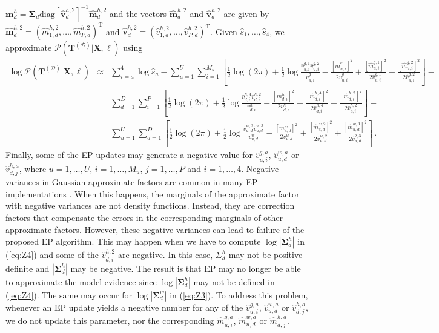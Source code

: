\documentclass{article}
\begin{document}
$\mathbf{m}_d^h = \bm \Sigma_d \text{diag}[\hat{\mathbf{v}}_d^{h,2}]^{-1} \hat{\mathbf{m}}_d^{h,2}$
and the vectors $\hat{\mathbf{m}}_d^{h,2}$ and $\hat{\mathbf{v}}_d^{h,2}$ are given by
$\hat{\mathbf{m}}_d^{h,2}=(\hat{m}_{1,d}^{h,2},\ldots,\hat{m}_{P,d}^{h,2})^\text{T}$ and
$\hat{\mathbf{v}}_d^{h,2}=(\hat{v}_{1,d}^{h,2},\ldots,\hat{v}_{P,d}^{h,2})^\text{T}$.
Given $\hat{s}_1,\ldots,\hat{s}_4$, we approximate $\mathcal{P}(\mathbf{T}^{(\mathcal{D})}|\mathbf{X},\ell)$ using
\begin{eqnarray}
\log \mathcal{P}(\mathbf{T}^{(\mathcal{D})}|\mathbf{X},\ell) & \approx & \sum_{i=a}^{4}\log\hat{s}_{a}-
\sum_{u=1}^{U}\sum_{i=1}^{M_u}\left[\frac{1}{2}\log(2\pi)+\frac{1}{2}\log \frac{\hat{v}_{u,i}^{g,1} \hat{v}_{u,i}^{g,2}}{v_{u,i}^g}-
\frac{[m_{u,i}^g]^2}{2v_{u,i}^g}+\frac{[\hat{m}_{u,i}^{g,1}]^2}{2\hat{v}_{u,i}^{g,1}}+
\frac{[\hat{m}_{u,i}^{g,2}]^2}{2\hat{v}_{u,i}^{g,2}}\right]-\nonumber\\
& & \sum_{d=1}^{D}\sum_{i=1}^{P}\left[
\frac{1}{2}\log(2\pi)+\frac{1}{2}\log \frac{\hat{v}_{d,i}^{h,4} \hat{v}_{d,i}^{h,2}}{v_{d,i}^h}-
\frac{[m_{d,i}^h]^2}{2v_{d,i}^h}+\frac{[\hat{m}_{d,i}^{h,4}]^2}{2\hat{v}_{d,i}^{h,4}}+
\frac{[\hat{m}_{d,i}^{h,2}]^2}{2\hat{v}_{d,i}^{h,2}}\right]-\nonumber\\
& & \sum_{u=1}^{U}\sum_{d=1}^{D}\left[\frac{1}{2}\log(2\pi)+
\frac{1}{2}\log \frac{\hat{v}_{u,d}^{w,2}\hat{v}_{u,d}^{w,3}}{v_{u,d}^w}-
\frac{[m_{u,d}^w]^2}{2v_{u,d}^w}+\frac{[\hat{m}_{u,d}^{w,2}]^2}{2\hat{v}_{u,d}^{w,2}}+
\frac{[\hat{m}_{u,d}^{w,3}]^2}{2\hat{v}_{u,d}^{2,3}}\right]\,.\label{eq:EPevidenceApprox}
\end{eqnarray}
Finally, some of the EP updates may generate a negative value for $\hat{v}_{u,i}^{g,a}$, 
$\hat{v}_{u,d}^{w,a}$ or $\hat{v}_{d,j}^{h,a}$, where $u = 1,\ldots,U$, $i = 1,\ldots,M_u$, $j = 1,\ldots,P$ and $i = 1,\ldots,4$.
Negative variances in Gaussian approximate factors 
are common in many EP implementations \citep{Minka2001,Minka2002}.
When this happens, the marginals of the approximate factor with negative 
variances are not density functions. Instead, they
are correction factors that compensate the errors in the corresponding marginals of other approximate factors.
However, these negative variances can lead to failure of the proposed EP algorithm.
This may happen when we have to compute $\log|\bm \Sigma_d^h|$ in (\ref{eq:Z4}) and some
of the $\hat{v}_{d,i}^{h,2}$ are negative. In this case, $\Sigma_d^h$ may not be
positive definite and $|\bm \Sigma_d^h|$ may be negative. The result is that EP may no longer be able to approximate the model evidence
since $\log |\bm \Sigma_d^h|$ may not be defined in (\ref{eq:Z4}).
The same may occur for $\log|\bm \Sigma_d^w|$ in (\ref{eq:Z3}).
To address this problem, whenever an EP update yields a negative number for any of the
$\hat{v}_{u,i}^{g,a}$, $\hat{v}_{u,d}^{w,a}$ or $\hat{v}_{d,j}^{h,a}$, we do not update this parameter, nor the corresponding
$\hat{m}_{u,i}^{g,a}$, $\hat{m}_{u,d}^{w,a}$ or $\hat{m}_{d,j}^{h,a}$.
\end{document}
